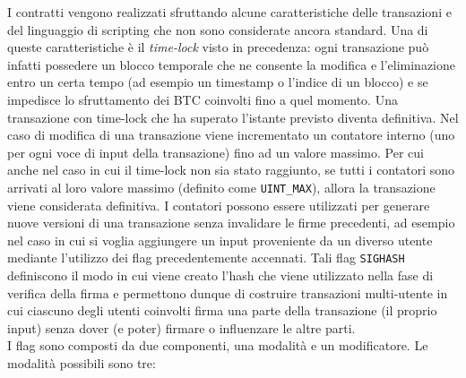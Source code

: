 I contratti vengono realizzati sfruttando alcune caratteristiche delle transazioni e del linguaggio di scripting che non sono considerate ancora standard.
Una di queste caratteristiche è il \emph{time-lock} visto in precedenza: ogni transazione può infatti possedere un blocco temporale che ne consente la modifica e l'eliminazione entro un certa tempo (ad esempio un timestamp o l'indice di un blocco) e se impedisce lo sfruttamento dei BTC coinvolti fino a quel momento. Una transazione con time-lock che ha superato l'istante previsto diventa definitiva.
Nel caso di modifica di una transazione viene incrementato un contatore interno (uno per ogni voce di input della transazione) fino ad un valore massimo. Per cui anche nel caso in cui il time-lock non sia stato raggiunto, se tutti i contatori sono arrivati al loro valore massimo (definito come \verb|UINT_MAX|), allora la transazione viene considerata definitiva. I contatori possono essere utilizzati per generare nuove versioni di una transazione senza invalidare le firme precedenti, ad esempio nel caso in cui si voglia aggiungere un input proveniente da un diverso utente mediante l'utilizzo dei flag precedentemente accennati. Tali flag \verb|SIGHASH| definiscono il modo in cui viene creato l'hash che viene utilizzato nella fase di verifica della firma e permettono dunque di costruire transazioni multi-utente in cui ciascuno degli utenti coinvolti firma una parte della transazione (il proprio input) senza dover (e poter) firmare o influenzare le altre parti.\\
I flag sono composti da due componenti, una modalità e un modificatore. Le modalità possibili sono tre:
